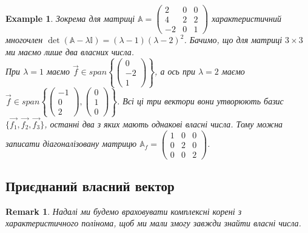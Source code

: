 \documentclass[a4paper, 10pt]{article}
\theoremstyle{theoremdd}
\theoremstyle{theoremdd}
\theoremstyle{theoremdd}
\theoremstyle{theoremdd}
\newtheorem{example}[theorem]{Example}
\theoremstyle{theoremdd}
\theoremstyle{theoremdd}
\newtheorem{remark}[theorem]{Remark}
\theoremstyle{theoremdd}
\theoremstyle{theoremdd}
\begin{document}
\begin{example}
Зокрема для матриці $\mathbb{A} = \begin{pmatrix}
2 & 0 & 0 \\
4 & 2 & 2 \\
-2 & 0 & 1
\end{pmatrix}$ характеристичний многочлен $\det (\mathbb{A}-\lambda \mathbb{I}) = (\lambda-1)(\lambda-2)^2$. Бачимо, що для матриці $3 \times 3$ ми маємо лише два власних числа.\\
При $\lambda = 1$ маємо $\vec{f} \in span \left\{ \begin{pmatrix}
0 \\ -2 \\ 1
\end{pmatrix} \right\}$, а ось при $\lambda = 2$ маємо $\vec{f} \in span \left\{ \begin{pmatrix}
-1 \\ 0 \\ 2
\end{pmatrix}, \begin{pmatrix}
0 \\ 1 \\ 0
\end{pmatrix} \right\}$. Всі ці три вектори вони утворюють базис $\{\vec{f_1},\vec{f_2},\vec{f_3} \}$, останні два з яких мають однакові власні числа. Тому можна записати діагоналізовану матрицю $\mathbb{A}_f = \begin{pmatrix}
1 & 0 & 0 \\
0 & 2 & 0 \\
0 & 0 & 2
\end{pmatrix}$.
\end{example}

\subsection{Приєднаний власний вектор}
\begin{remark}
Надалі ми будемо враховувати комплексні корені з характеристичного полінома, щоб ми мали змогу завжди знайти власні числа.
\end{remark}
\end{document}
